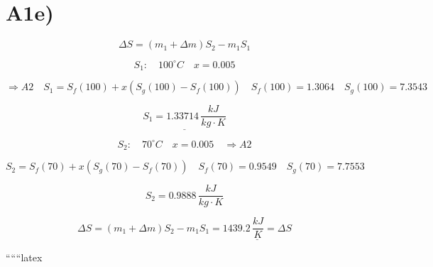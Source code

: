\section*{A1e)}

\[
\Delta S = (m_1 + \Delta m) S_2 - m_1 S_1
\]

\[
S_1: \quad 100^\circ C \quad x = 0.005
\]

\[
\Rightarrow A2 \quad S_1 = S_f (100) + x (S_g (100) - S_f (100)) \quad S_f (100) = 1.3064 \quad S_g (100) = 7.3543
\]

\[
\underline{S_1 = 1.33714 \, \frac{kJ}{kg \cdot K}}
\]

\[
S_2: \quad 70^\circ C \quad x = 0.005 \quad \Rightarrow A2
\]

\[
S_2 = S_f (70) + x (S_g (70) - S_f (70)) \quad S_f (70) = 0.9549 \quad S_g (70) = 7.7553
\]

\[
S_2 = 0.9888 \, \frac{kJ}{kg \cdot K}
\]

\[
\Delta S = (m_1 + \Delta m) S_2 - m_1 S_1 = \underline{1439.2 \, \frac{kJ}{K} = \Delta S}
\]

``````latex